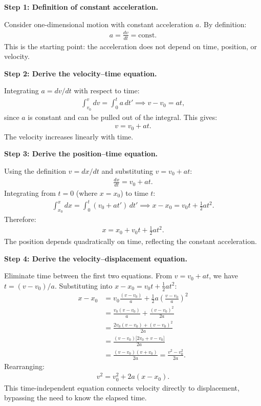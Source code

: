 \textbf{Step 1: Definition of constant acceleration.}

Consider one-dimensional motion with constant acceleration $a$. By definition:
\begin{align}
a = \frac{dv}{dt} = \text{const.}
\end{align}
This is the starting point: the acceleration does not depend on time, position, or velocity.

\textbf{Step 2: Derive the velocity--time equation.}

Integrating $a = dv/dt$ with respect to time:
\begin{align}
\int_{v_0}^{v} dv = \int_0^t a\,dt' \implies v - v_0 = at,
\end{align}
since $a$ is constant and can be pulled out of the integral. This gives:
\begin{align}
\boxed{v = v_0 + at.}
\end{align}
The velocity increases linearly with time.

\textbf{Step 3: Derive the position--time equation.}

Using the definition $v = dx/dt$ and substituting $v = v_0 + at$:
\begin{align}
\frac{dx}{dt} = v_0 + at.
\end{align}
Integrating from $t = 0$ (where $x = x_0$) to time $t$:
\begin{align}
\int_{x_0}^{x} dx = \int_0^t (v_0 + at')\,dt' \implies x - x_0 = v_0 t + \frac{1}{2}at^2.
\end{align}
Therefore:
\begin{align}
\boxed{x = x_0 + v_0 t + \tfrac{1}{2}at^2.}
\end{align}
The position depends quadratically on time, reflecting the constant acceleration.

\textbf{Step 4: Derive the velocity--displacement equation.}

Eliminate time between the first two equations. From $v = v_0 + at$, we have $t = (v - v_0)/a$. Substituting into $x - x_0 = v_0 t + \frac{1}{2}at^2$:
\begin{align}
x - x_0 &= v_0\frac{(v - v_0)}{a} + \frac{1}{2}a\left(\frac{v - v_0}{a}\right)^2 \\
&= \frac{v_0(v - v_0)}{a} + \frac{(v - v_0)^2}{2a} \\
&= \frac{2v_0(v - v_0) + (v - v_0)^2}{2a} \\
&= \frac{(v - v_0)\bigl[2v_0 + v - v_0\bigr]}{2a} \\
&= \frac{(v - v_0)(v + v_0)}{2a} = \frac{v^2 - v_0^2}{2a}.
\end{align}
Rearranging:
\begin{align}
\boxed{v^2 = v_0^2 + 2a(x - x_0).}
\end{align}
This time-independent equation connects velocity directly to displacement, bypassing the need to know the elapsed time.

